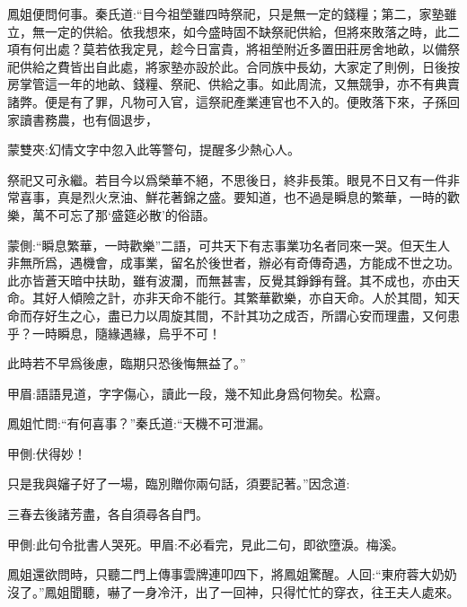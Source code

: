 \begin{parag}
    鳳姐便問何事。秦氏道:“目今祖塋雖四時祭祀，只是無一定的錢糧；第二，家塾雖立，無一定的供給。依我想來，如今盛時固不缺祭祀供給，但將來敗落之時，此二項有何出處？莫若依我定見，趁今日富貴，將祖塋附近多置田莊房舍地畝，以備祭祀供給之費皆出自此處，將家塾亦設於此。合同族中長幼，大家定了則例，日後按房掌管這一年的地畝、錢糧、祭祀、供給之事。如此周流，又無競爭，亦不有典賣諸弊。便是有了罪，凡物可入官，這祭祀產業連官也不入的。便敗落下來，子孫回家讀書務農，也有個退步，\begin{note}蒙雙夾:幻情文字中忽入此等警句，提醒多少熱心人。\end{note}祭祀又可永繼。若目今以爲榮華不絕，不思後日，終非長策。眼見不日又有一件非常喜事，真是烈火烹油、鮮花著錦之盛。要知道，也不過是瞬息的繁華，一時的歡樂，萬不可忘了那‘盛筵必散’的俗語。\begin{note}蒙側:“瞬息繁華，一時歡樂”二語，可共天下有志事業功名者同來一哭。但天生人非無所爲，遇機會，成事業，留名於後世者，辦必有奇傳奇遇，方能成不世之功。此亦皆蒼天暗中扶助，雖有波瀾，而無甚害，反覺其錚錚有聲。其不成也，亦由天命。其好人傾險之計，亦非天命不能行。其繁華歡樂，亦自天命。人於其間，知天命而存好生之心，盡已力以周旋其間，不計其功之成否，所謂心安而理盡，又何患乎？一時瞬息，隨緣遇緣，烏乎不可！\end{note}此時若不早爲後慮，臨期只恐後悔無益了。”\begin{note}甲眉:語語見道，字字傷心，讀此一段，幾不知此身爲何物矣。松齋。\end{note}鳳姐忙問:“有何喜事？”秦氏道:“天機不可泄漏。\begin{note}甲側:伏得妙！\end{note}只是我與嬸子好了一場，臨別贈你兩句話，須要記著。”因念道:
\end{parag}


\begin{poem}
    \begin{pl}三春去後諸芳盡，各自須尋各自門。\end{pl}
    \begin{note}甲側:此句令批書人哭死。甲眉:不必看完，見此二句，即欲墮淚。梅溪。\end{note}
\end{poem}


\begin{parag}
    鳳姐還欲問時，只聽二門上傳事雲牌連叩四下，將鳳姐驚醒。人回:“東府蓉大奶奶沒了。”鳳姐聞聽，嚇了一身冷汗，出了一回神，只得忙忙的穿衣，往王夫人處來。
\end{parag}


